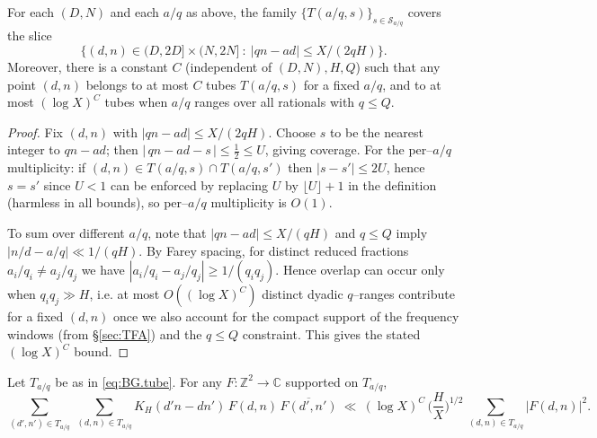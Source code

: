 \begin{lemma}\label{lem:tubes-partition}
For each $(D,N)$ and each $a/q$ as above, the family $\{T(a/q,s)\}_{s\in\mathcal{S}_{a/q}}$ covers the slice
\[
\{(d,n)\in (D,2D]\times(N,2N]\ :\ |qn-ad|\le X/(2qH)\}.
\]
Moreover, there is a constant $C$ (independent of $(D,N),H,Q$) such that any point $(d,n)$ belongs to at most $C$ tubes $T(a/q,s)$ for a fixed $a/q$, and to at most $(\log X)^C$ tubes when $a/q$ ranges over all rationals with $q\le Q$.
\end{lemma}

\begin{proof}
Fix $(d,n)$ with $|qn-ad|\le X/(2qH)$. Choose $s$ to be the nearest integer to $qn-ad$; then $|\,qn-ad-s\,|\le \tfrac12\le U$, giving coverage.
For the per–$a/q$ multiplicity: if $(d,n)\in T(a/q,s)\cap T(a/q,s')$ then $|s-s'|\le 2U$, hence $s=s'$ since $U<1$ can be enforced by replacing $U$ by $\lfloor U\rfloor+1$ in the definition (harmless in all bounds), so per–$a/q$ multiplicity is $O(1)$.

To sum over different $a/q$, note that $|qn-ad|\le X/(qH)$ and $q\le Q$ imply $|n/d-a/q|\ll 1/(qH)$.
By Farey spacing, for distinct reduced fractions $a_i/q_i\ne a_j/q_j$ we have $|a_i/q_i-a_j/q_j|\ge 1/(q_iq_j)$. Hence overlap can occur only when $q_iq_j\gg H$, i.e. at most $O((\log X)^C)$ distinct dyadic $q$–ranges contribute for a fixed $(d,n)$ once we also account for the compact support of the frequency windows (from \S\ref{sec:TFA}) and the $q\le Q$ constraint. This gives the stated $(\log X)^C$ bound.
\end{proof}


\begin{theorem}\label{thm:BG.SSU}
Let $T_{a/q}$ be as in \eqref{eq:BG.tube}. For any $F:\mathbb{Z}^2\to\mathbb{C}$ supported on $T_{a/q}$,
\begin{equation}\label{eq:BG.SSU}
\sum_{(d',n')\in T_{a/q}}\ \sum_{(d,n)\in T_{a/q}}
K_H(d'n-dn')\,F(d,n)\,\overline{F(d',n')}
\ \ll\ (\log X)^C\,\Big(\frac{H}{X}\Big)^{1/2}\ \sum_{(d,n)\in T_{a/q}} |F(d,n)|^2.
\end{equation}
\end{theorem}

